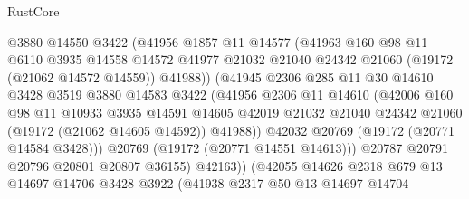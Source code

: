 \begin{lexlean}{RustCore}
\begin{coremodule}
                        @3880
                        @14550
                        @3422
                        (@41956
                          @1857
                          @11
                          @14577
                          (@41963
                            @160
                            @98
                            @11
                            @6110
                            @3935
                            @14558
                            @14572
                            @41977
                            @21032
                            @21040
                            @24342
                            @21060
                            (@19172 (@21062 @14572 @14559))
                            @41988))
                        (@41945
                          @2306
                          @285
                          @11
                          @30
                          @14610
                          @3428
                          @3519
                          @3880
                          @14583
                          @3422
                          (@41956
                            @2306
                            @11
                            @14610
                            (@42006
                              @160
                              @98
                              @11
                              @10933
                              @3935
                              @14591
                              @14605
                              @42019
                              @21032
                              @21040
                              @24342
                              @21060
                              (@19172 (@21062 @14605 @14592))
                              @41988))
                          @42032
                          @20769
                          (@19172 (@20771 @14584 @3428)))
                        @20769
                        (@19172 (@20771 @14551 @14613)))
                      @20787
                      @20791
                      @20796
                      @20801
                      @20807
                      @36155)
                    @42163))
                (@42055
                  @14626
                  @2318
                  @679
                  @13
                  @14697
                  @14706
                  @3428
                  @3922
                  (@41938
                    @2317
                    @50
                    @13
                    @14697
                    @14704

\end{coremodule}
\end{lexlean}
